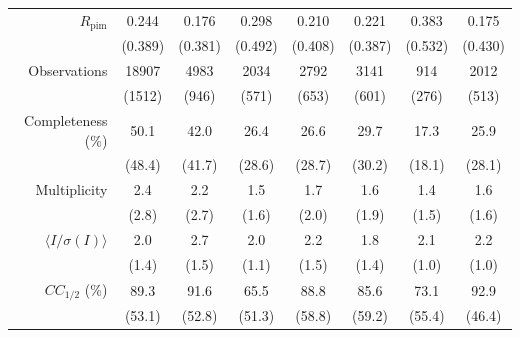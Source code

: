 \documentclass{article}
\begin{document}
\begin{table}[H]
\begin{tabular}{rSSSSSSS}
  \addlinespace
  $R_\textrm{pim}$   & 0.244  & 0.176   & 0.298   & 0.210   & 0.221   & 0.383   & 0.175  \\
                    & (0.389) & (0.381) & (0.492) & (0.408) & (0.387) & (0.532) & (0.430) \\
  \addlinespace
  Observations      & {18907}   & {4983}  & {2034}  & {2792}  & {3141}  & {914}   & {2012}  \\
                    & {(1512)}  & {(946)} & {(571)} & {(653)} & {(601)} & {(276)} & {(513)} \\
  \addlinespace
  Completeness (\%) & 50.1    & 42.0   & 26.4   & 26.6   & 29.7   & 17.3   & 25.9 \\
                    & (48.4)  & (41.7) & (28.6) & (28.7) & (30.2) & (18.1) & (28.1) \\
  \addlinespace
  Multiplicity      &  2.4     & 2.2   & 1.5    & 1.7    & 1.6    & 1.4   &  1.6  \\
                    & (2.8)   & (2.7) & (1.6)   & (2.0)  & (1.9)  & (1.5) & (1.6) \\
  \addlinespace
  $\langle I/\sigma(I) \rangle$ & 2.0   & 2.7   & 2.0   & 2.2   & 1.8   &  2.1  & 2.2 \\
                                & (1.4) & (1.5) & (1.1) & (1.5) & (1.4) & (1.0) & (1.0) \\
  \addlinespace
  $CC_{{1}/{2}}$ (\%) & 89.3  & 91.6   & 65.5   & 88.8   & 85.6   & 73.1   & 92.9 \\
                      &(53.1) & (52.8) & (51.3) & (58.8) & (59.2) & (55.4) & (46.4) \\
  \bottomrule
\end{tabular}

\end{table}

%
\end{document}
